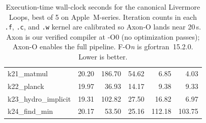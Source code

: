 \begin{table}
\begin{tabular}{@{}l r r r r r@{}}
    k21\_matmul                &   20.20 &   186.70 & 54.62 &  6.85 &  4.03 \\
    k22\_planck                &   19.97 &    36.93 & 14.17 &  9.38 &  9.33 \\
    k23\_hydro\_implicit       &   19.31 &   102.82 & 27.50 & 16.82 &  6.97 \\
    k24\_find\_min             &   20.17 &    53.50 & 25.16 & 112.18 & 103.75 \\
    \bottomrule
  \end{tabular}
  \caption{Execution-time wall-clock seconds for the canonical
           Livermore Loops, best of 5 on Apple~M-series.
           Iteration counts in each \texttt{.f}, \texttt{.c}, and
           \texttt{.w} kernel are calibrated so Axon-O lands near
           20\,s. Axon is our verified compiler at \mbox{-O0} (no
           optimization passes); Axon-O enables the full pipeline.
           F-O\textit{n} is gfortran~15.2.0. Lower is better.}
  \label{tab:exec-time}
\end{table}
